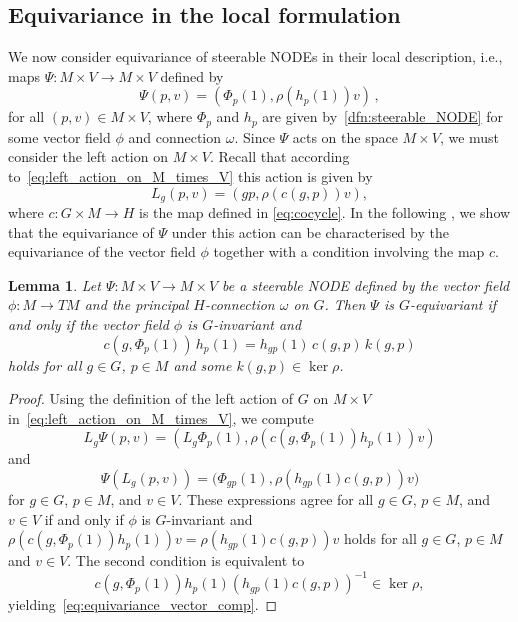 \documentclass[12pt,a4paper]{article}
\numberwithin{equation}{section}
\theoremstyle{plain}
\newtheorem{lemma}[theorem]{Lemma}
\theoremstyle{definition}
\theoremstyle{remark}
\begin{document}
\subsection{Equivariance in the local formulation}\label{sec:local_form_of_equiv}
We now consider equivariance of steerable NODEs in their local description, i.e., maps $\Psi:M\times V\to M\times V$ defined by
\begin{equation}
    \Psi(p,v)=(\Phi_p(1),\rho(h_p(1))v)\,,
\end{equation}
for all $(p,v)\in M\times V$, where $\Phi_p$ and $h_p$ are given by~\cref{dfn:steerable_NODE} for some vector field $\phi$ and connection $\omega$. Since $\Psi$ acts on the space $M\times V$, we must consider the left action on $M\times V$. Recall that according to~\eqref{eq:left_action_on_M_times_V} this action is given by
\begin{equation}
    L_g(p,v)=(gp,\rho(c(g,p))v),
\end{equation}
where $c:G\times M\to H$ is the map defined in \eqref{eq:cocycle}. In the following , we show that the equivariance of $\Psi$ under this action can be characterised by the equivariance of the vector field $\phi$ together with a condition involving the map $c$.

\begin{lemma}\label{lem:local_equiv}
    Let $\Psi:M\times V\to M\times V$ be a steerable NODE defined by the vector field $\phi: M\to TM$ and the principal $H$-connection $\omega$ on $G$. Then $\Psi$ is $G$-equivariant if and only if the vector field $\phi$ is $G$-invariant and
    \begin{equation}\label{eq:equivariance_vector_comp}
        c(g,\Phi_p(1))\, h_p(1)
        = h_{g p}(1)\, c(g,p)\, k(g,p)
    \end{equation}
    holds for all $g\in G$, $p\in M$ and some $k(g,p) \in \ker \rho$.
\end{lemma}
\begin{proof}
    Using the definition of the left action of $G$ on $M\times V$ in~\eqref{eq:left_action_on_M_times_V}, we compute
    \begin{equation}
        L_g \Psi(p, v) = (L_g \Phi_p(1), \rho(c(g, \Phi_p(1)) h_p(1)) v)
    \end{equation}
    and
    \begin{equation}
        \Psi(L_g(p, v)) = \big(\Phi_{gp}(1), \rho(h_{gp}(1)c(g,p)) v \big)
    \end{equation}
    for $g \in G$, $p \in M$, and $v \in V$. These expressions agree for all $g \in G$, $p \in M$, and $v \in V$ if and only if $\phi$ is $G$-invariant and $\rho(c(g, \Phi_p(1)) h_p(1)) v=\rho(h_{gp}(1)c(g,p)) v$ holds for all $g\in G$, $p\in M$ and $v\in V$. The second condition is equivalent to
    \begin{equation}
        c(g, \Phi_p(1)) h_p(1) \left(h_{gp}(1)c(g,p)\right)^{-1}\in\ker{\rho},
    \end{equation}
    yielding~\eqref{eq:equivariance_vector_comp}.
\end{proof}
\end{document}
